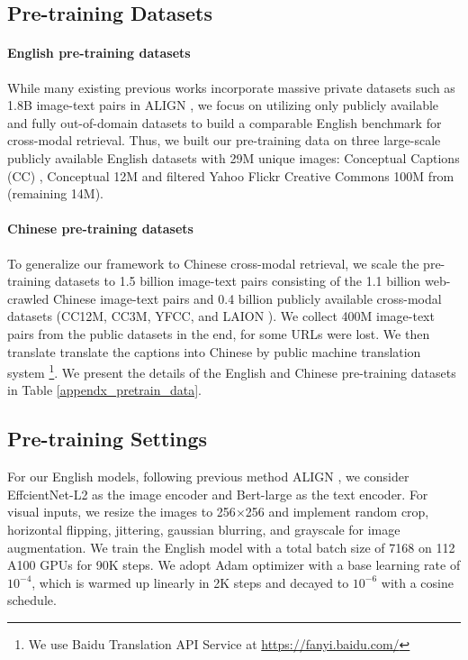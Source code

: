 \documentclass{article}
\begin{document}
\subsection{Pre-training Datasets} 
\label{sec:Pretraining Datasets}
\paragraph{English pre-training datasets}  While many existing previous works incorporate massive private datasets such as 1.8B image-text pairs in ALIGN \cite{Jia2021ScalingUV}, we focus on utilizing only publicly available and fully out-of-domain datasets to build a comparable English benchmark for cross-modal retrieval. Thus, we built our pre-training data on three large-scale publicly available English datasets with 29M unique images: Conceptual Captions (CC) \cite{ng2020understanding}, Conceptual 12M \cite{changpinyo2021cc12m} and filtered Yahoo Flickr Creative Commons 100M \cite{Thomee2016YFCC100MTN} from \cite{Radford2021LearningTV} (remaining 14M). 
\paragraph{Chinese pre-training datasets} To generalize our framework to Chinese cross-modal retrieval, we scale the pre-training datasets to 1.5 billion image-text pairs consisting of the 1.1 billion web-crawled Chinese image-text pairs and 0.4 billion publicly available cross-modal datasets (CC12M, CC3M, YFCC, and LAION\cite{schuhmann2021laion400m} ). We collect 400M image-text pairs from the public datasets in the end, for some URLs were lost. We then translate translate the captions into Chinese by public machine translation system \footnote{We use Baidu Translation API Service at \url{https://fanyi.baidu.com/}}.
We present the details of the English and Chinese pre-training datasets in Table \ref{appendx_pretrain_data}.

\subsection{Pre-training Settings}
\label{settings}
For our English models, following previous method ALIGN \cite{Jia2021ScalingUV}, we consider EffcientNet-L2\cite{pmlr-v97-tan19a} as the image encoder and Bert-large \cite{devlin-etal-2019-bert} as the text encoder. For visual inputs, we resize the images to 256$\times$256 and implement random crop, horizontal flipping, jittering, gaussian blurring, and grayscale for image augmentation. We train the English model with a total batch size of 7168 on 112 A100 GPUs for 90K steps. We adopt Adam optimizer \cite{DBLP:journals/corr/KingmaB14} with a base learning rate of $10^{-4}$, which is warmed up linearly in 2K steps and decayed to $10^{-6}$ with a cosine schedule. 
\end{document}
